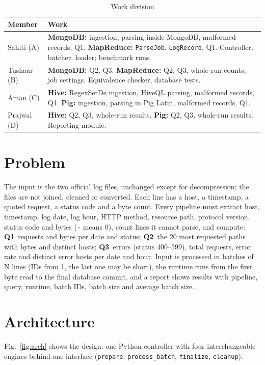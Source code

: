 \documentclass[conference]{IEEEtran}
\newcommand{\code}[1]{\texttt{\small #1}}
\begin{document}
\begin{table}[h]
\caption{Work division}
\label{tab:team}
\centering
\small
\begin{tabular}{@{}L{0.18\columnwidth}L{0.76\columnwidth}@{}}
\toprule
Member & Work \\
\midrule
Sahiti (A) & \textbf{MongoDB:} ingestion, parsing inside MongoDB, malformed records, Q1.
             \textbf{MapReduce:} \code{ParseJob}, \code{LogRecord}, Q1. Controller, batcher,
             loader; benchmark runs. \\
Tushaar (B) & \textbf{MongoDB:} Q2, Q3. \textbf{MapReduce:} Q2, Q3, whole-run counts, job
              settings. Equivalence checker, database tests. \\
Aman (C)   & \textbf{Hive:} RegexSerDe ingestion, HiveQL parsing, malformed records, Q1.
             \textbf{Pig:} ingestion, parsing in Pig Latin, malformed records, Q1. \\
Prajwal (D)& \textbf{Hive:} Q2, Q3, whole-run results. \textbf{Pig:} Q2, Q3, whole-run results.
             Reporting module. \\
\bottomrule
\end{tabular}
\end{table}

\section{Problem}
The input is the two official log files, unchanged except for decompression; the files are not
joined, cleaned or converted. Each line has a host, a timestamp, a quoted request, a status code
and a byte count. Every pipeline must extract host, timestamp, log date, log hour, HTTP method,
resource path, protocol version, status code and bytes (\code{-} means 0), count lines it cannot
parse, and compute:
\textbf{Q1}~requests and bytes per date and status;
\textbf{Q2}~the 20 most requested paths with bytes and distinct hosts;
\textbf{Q3}~errors (status 400--599), total requests, error rate and distinct error hosts per date
and hour. Input is processed in batches of N lines (IDs from 1, the last one may be short), the
runtime runs from the first byte read to the final database commit, and a report shows results with
pipeline, query, runtime, batch IDs, batch size and average batch size.

\section{Architecture}
Fig.~\ref{fig:arch} shows the design: one Python controller with four interchangeable engines
behind one interface (\code{prepare}, \code{process\_batch}, \code{finalize}, \code{cleanup}).
\end{document}
